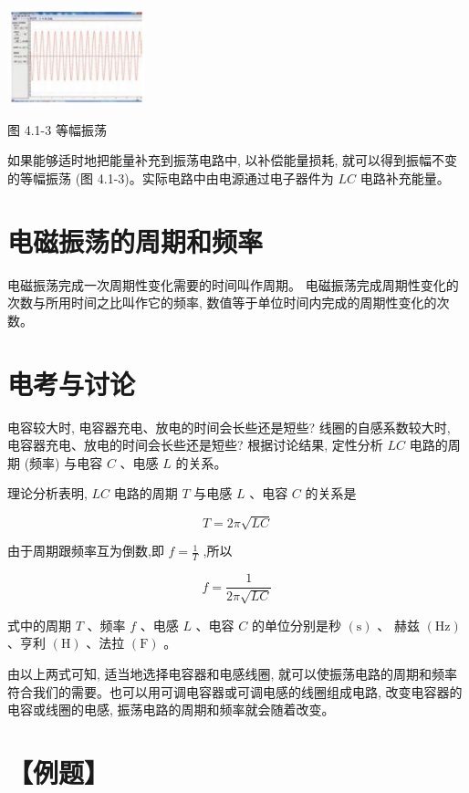 \documentclass[10pt]{article}
\begin{document}
\begin{center}
\includegraphics[max width=0.3\textwidth]{images/01910e72-c5b7-7ed5-a6d4-fb3a5faefc32_79_674844.jpg}
\end{center}

图 4.1-3 等幅振荡

如果能够适时地把能量补充到振荡电路中, 以补偿能量损耗, 就可以得到振幅不变的等幅振荡 (图 4.1-3)。实际电路中由电源通过电子器件为 \({LC}\) 电路补充能量。

\section*{电磁振荡的周期和频率}

电磁振荡完成一次周期性变化需要的时间叫作周期。 电磁振荡完成周期性变化的次数与所用时间之比叫作它的频率, 数值等于单位时间内完成的周期性变化的次数。

\section*{电考与讨论}

电容较大时, 电容器充电、放电的时间会长些还是短些? 线圈的自感系数较大时, 电容器充电、放电的时间会长些还是短些? 根据讨论结果, 定性分析 \({LC}\) 电路的周期 (频率) 与电容 \(C\) 、电感 \(L\) 的关系。

理论分析表明, \({LC}\) 电路的周期 \(T\) 与电感 \(L\) 、电容 \(C\) 的关系是

\[
T = {2\pi }\sqrt{LC}
\]

由于周期跟频率互为倒数,即 \(f = \frac{1}{T}\) ,所以

\[
f = \frac{1}{{2\pi }\sqrt{LC}}
\]

式中的周期 \(T\) 、频率 \(f\) 、电感 \(L\) 、电容 \(C\) 的单位分别是秒 \(\left( \mathrm{s}\right)\) 、 赫兹 \(\left( \mathrm{{Hz}}\right)\) 、亨利 \(\left( \mathrm{H}\right)\) 、法拉 \(\left( \mathrm{F}\right)\) 。

由以上两式可知, 适当地选择电容器和电感线圈, 就可以使振荡电路的周期和频率符合我们的需要。也可以用可调电容器或可调电感的线圈组成电路, 改变电容器的电容或线圈的电感, 振荡电路的周期和频率就会随着改变。

\section*{【例题】}
\end{document}

